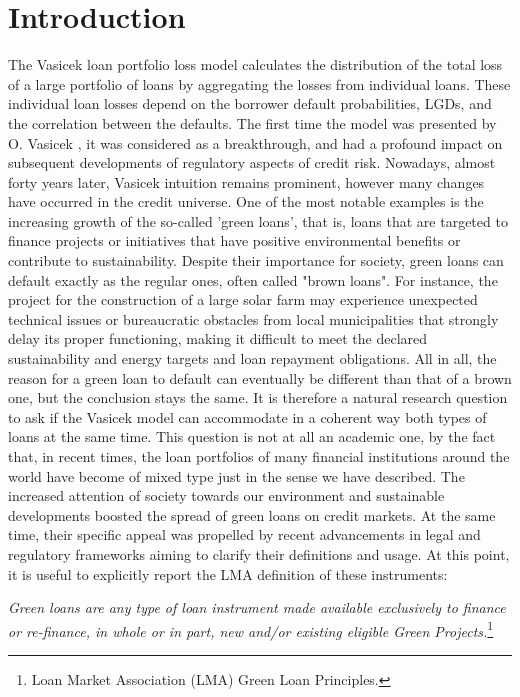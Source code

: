 \documentclass[preprint,12pt]{article}
\begin{document}
\section{Introduction}
The Vasicek loan portfolio loss model calculates the distribution of the total loss of a large portfolio of loans by aggregating the losses from individual loans. These individual loan losses depend on the borrower default probabilities, LGDs, and the correlation between the defaults. The first time the model was presented by O. Vasicek \cite{vas1}, it was considered as a breakthrough, and had a profound impact on subsequent developments of regulatory aspects of credit risk. Nowadays, almost forty years later, Vasicek intuition remains prominent, however many changes have occurred in the credit universe. One of the most notable examples is the increasing growth of the so-called 'green loans', that is, loans that are targeted to finance projects or initiatives that have positive environmental benefits or contribute to sustainability. Despite their importance for society, green loans can default exactly as the regular ones, often called "brown loans". For instance, the project for the construction of a large solar farm may experience unexpected technical issues or bureaucratic obstacles from local municipalities that strongly delay its proper functioning, making it difficult to meet the declared sustainability and energy targets and loan repayment obligations. All in all, the reason for a green loan to default can eventually be different than that of a brown one, but the conclusion stays the same. It is therefore a natural research question to ask if the Vasicek model can accommodate in a coherent way both types of loans at the same time. 
This question is not at all an academic one, by the fact that, in recent times, the loan portfolios of many financial institutions around the world have become of mixed type just in the sense we have described. The increased attention of society towards our environment and sustainable developments boosted the spread of green loans on credit markets. At the same time, their specific appeal was propelled by recent advancements in legal and regulatory frameworks aiming to clarify their definitions and usage. At this point, it is useful to explicitly report the LMA definition of these instruments:

\smallskip

\textit{Green loans are any type of loan instrument made available exclusively to finance or re-finance, in whole or in part, new and/or existing eligible Green Projects.}\footnote{Loan Market Association (LMA) Green Loan Principles.}
\end{document}
